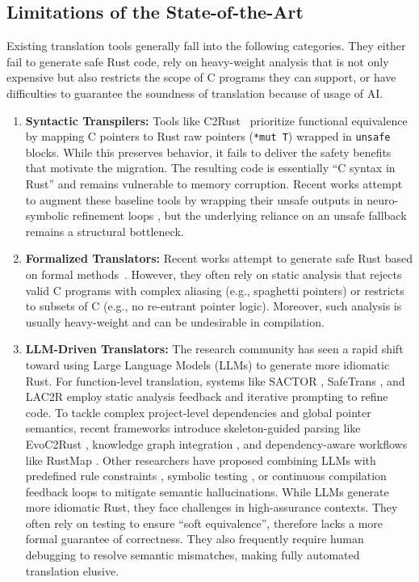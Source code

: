 \documentclass{llncs} %
\begin{document}
\subsection{Limitations of the State-of-the-Art}
%
Existing translation tools generally fall into the following categories. They either fail to generate safe Rust code, rely on heavy-weight analysis that is not only expensive but also restricts the scope of C programs they can support, or have difficulties to guarantee the soundness of translation because of usage of AI.
%
\begin{enumerate}
    \item \textbf{Syntactic Transpilers:} Tools like C2Rust~\cite{C2Rust} prioritize functional equivalence by mapping C pointers to Rust raw pointers (\texttt{*mut T}) wrapped in \texttt{unsafe} blocks. While this preserves behavior, it fails to deliver the safety benefits that motivate the migration. The resulting code is essentially ``C syntax in Rust'' and remains vulnerable to memory corruption. Recent works attempt to augment these baseline tools by wrapping their unsafe outputs in neuro-symbolic refinement loops \cite{nitin2025c2saferrust}, but the underlying reliance on an unsafe fallback remains a structural bottleneck.
    \item \textbf{Formalized Translators:} Recent works attempt to generate safe Rust based on formal methods~\cite{Emre2021,Fromherz2024}. However, they often rely on static analysis that rejects valid C programs with complex aliasing (e.g., spaghetti pointers) or restricts to subsets of C (e.g., no re-entrant pointer logic). Moreover, such analysis is usually heavy-weight and can be undesirable in compilation.
    \item \textbf{LLM-Driven Translators:} The research community has seen a rapid shift toward using Large Language Models (LLMs) to generate more idiomatic Rust. For function-level translation, systems like SACTOR \cite{zhou2025sactor}, SafeTrans \cite{farrukh2025safetrans}, and LAC2R \cite{sim2025lac2r} employ static analysis feedback and iterative prompting to refine code. To tackle complex project-level dependencies and global pointer semantics, recent frameworks introduce skeleton-guided parsing like EvoC2Rust \cite{wang2025evoc2rust}, knowledge graph integration \cite{yuan2025projectlevel}, and dependency-aware workflows like RustMap \cite{cai2025rustmap}. Other researchers have proposed combining LLMs with predefined rule constraints \cite{luo2025irene}, symbolic testing \cite{bai2025rustassure}, or continuous compilation feedback loops \cite{shiraishi2024smartc2rust} to mitigate semantic hallucinations. While LLMs generate more idiomatic Rust, they face challenges in high-assurance contexts. They often rely on testing to ensure ``soft equivalence'', therefore lacks a more formal guarantee of correctness. They also frequently require human debugging to resolve semantic mismatches, making fully automated translation elusive.
\end{enumerate}
\end{document}
